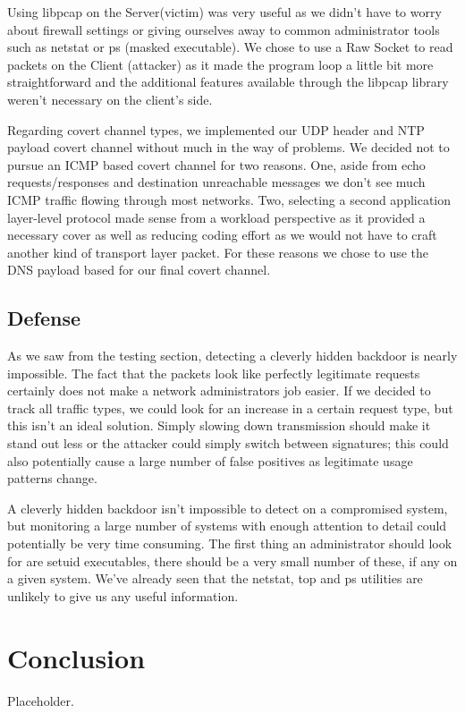 \documentclass[titlepage]{article}
\begin{document}
Using libpcap on the Server(victim) was very useful as we didn't have to worry about firewall settings or giving ourselves away to common administrator tools such as netstat or ps (masked executable).  We chose to use a Raw Socket to read packets on the Client (attacker) as it made the program loop a little bit more straightforward and the additional features available through the libpcap library weren't necessary on the client's side.

Regarding covert channel types, we implemented our UDP header and NTP payload covert channel without much in the way of problems.  We decided not to pursue an ICMP based covert channel for two reasons. One, aside from echo requests/responses and destination unreachable messages we don't see much ICMP traffic flowing through most networks. Two, selecting a second application layer-level protocol made sense from a workload perspective as it provided a necessary cover as well as reducing coding effort as we would not have to craft another kind of transport layer packet.  For these reasons we chose to use the DNS payload based for our final covert channel.

\subsection{Defense}

As we saw from the testing section, detecting a cleverly hidden backdoor is nearly impossible.  The fact that the packets look like perfectly legitimate requests certainly does not make a network administrators job easier. If we decided to track all traffic types, we could look for an increase in a certain request type, but this isn't an ideal solution. Simply slowing down transmission should make it stand out less or the attacker could simply switch between signatures; this could also potentially cause a large number of false positives as legitimate usage patterns change.

A cleverly hidden backdoor isn't impossible to detect on a compromised system, but monitoring a large number of systems with enough attention to detail could potentially be very time consuming.  The first thing an administrator should look for are setuid executables, there should be a very small number of these, if any on a given system.  We've already seen that the netstat, top and ps utilities are unlikely to give us any useful information.

\section{Conclusion}

Placeholder.
\end{document}
